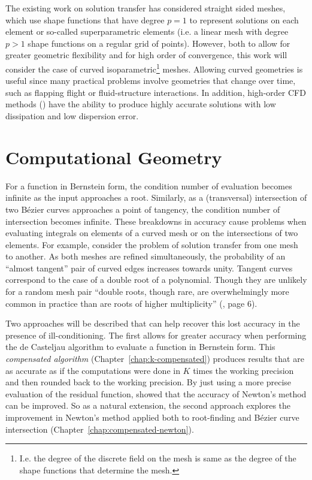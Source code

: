The existing work on solution transfer has considered straight sided meshes,
which use shape functions that have degree \(p = 1\) to represent solutions
on each element or so-called superparametric elements (i.e. a linear mesh
with degree \(p > 1\) shape functions on a regular grid of points).
However, both to allow for greater geometric flexibility
and for high order of convergence, this work will consider the case
of curved isoparametric\footnote{I.e. the degree of the discrete field on the
mesh is same as the degree of the shape functions that determine the
mesh.} meshes. Allowing curved geometries is useful since many practical
problems involve geometries that change over time, such as flapping flight
or fluid-structure interactions. In addition, high-order CFD methods
(\cite{Wang2013}) have the ability to produce highly accurate solutions
with low dissipation and low dispersion error.

\section{Computational Geometry}

For a function in Bernstein form, the condition number of evaluation
becomes infinite as the input approaches a root. Similarly,
as a (transversal) intersection of two B\'{e}zier curves approaches a
point of tangency, the condition number of intersection becomes
infinite. These breakdowns in accuracy cause problems when evaluating
integrals on elements of a curved mesh or on the intersections of two
elements. For example, consider the problem of solution transfer from
one mesh to another. As both meshes are refined simultaneously, the
probability of an ``almost tangent'' pair of curved edges increases
towards unity. Tangent curves correspond to the case of a double root
of a polynomial. Though they are unlikely for a random mesh pair
``double roots, though rare, are overwhelmingly more common in practice
than are roots of higher multiplicity'' (\cite{Kahan1972}, page 6).

Two approaches will be described that can help recover this lost accuracy
in the presence of ill-conditioning. The first allows for greater
accuracy when performing the de Casteljau algorithm to evaluate
a function in Bernstein form. This \emph{compensated algorithm}
(Chapter~\ref{chap:k-compensated}) produces results that are as accurate as if
the computations were done in \(K\) times the working precision
and then rounded back to the working precision. By just using a
more precise evaluation of the residual function,
\cite{Tisseur2001} showed that the accuracy of Newton's method can
be improved. So as a natural extension, the second approach
explores the improvement in Newton's method applied both to
root-finding and B\'{e}zier curve intersection
(Chapter~\ref{chap:compensated-newton}).

